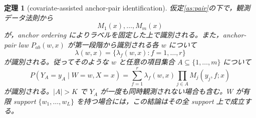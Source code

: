 \documentclass[11pt,a4paper]{ltjsarticle}
\newtheorem{theorem}{定理}[section]
\theoremstyle{remark}\newtheorem{remark}{注意}[section]
\begin{document}
\begin{theorem}[covariate-assisted anchor-pair identification]\label{thm:pair}
仮定\ref{as:pair}の下で，観測データ法則から
\[
M_1(x),\ldots,M_m(x)
\]
が，anchor ordering によりラベルを固定した上で識別される。また，anchor-pair law $P_{ab}(w,x)$ が第一段階から識別される各 $w$ について
\[
\lambda(w,x)=\{\lambda_f(w,x):f=1,\ldots,r\}
\]
が識別される。従ってそのような $w$ と任意の項目集合 $A\subseteq\{1,\ldots,m\}$ について
\begin{equation}
P(Y_A=y_A\mid W=w,X=x)
=\sum_{f=1}^r\lambda_f(w,x)\prod_{j\in A}M_j(y_j,f;x)\label{eq:latent-fulljoint}
\end{equation}
が識別される。$|A|>K$ で $Y_A$ が一度も同時観測されない場合も含む。$W$ が有限 support $\{w_1,\ldots,w_L\}$ を持つ場合には，この結論はその全 support 上で成立する。
\end{theorem}
\end{document}
